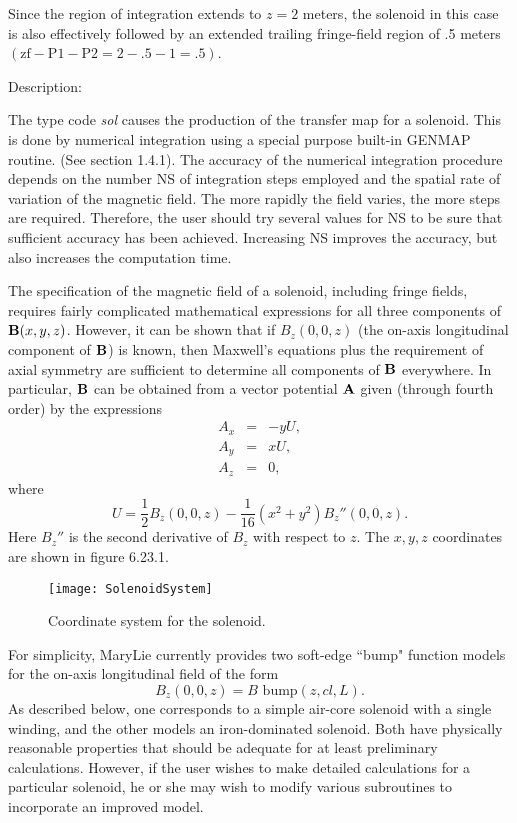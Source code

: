     Since the region of integration extends to $z=2$ meters, the solenoid in this case is also effectively followed by an extended trailing fringe-field region of .5 meters
$(\mbox{zf} - \mbox{P1} - \mbox{P2} = 2 - .5 - 1 = .5 )$.

\vspace{5mm}
     Description:
\vspace{2mm}

     The type code {\em sol } causes the production of the transfer map
for a solenoid.  This is done by numerical integration using a special
purpose built-in GENMAP routine.  (See section 1.4.1).  The accuracy of the numerical integration procedure depends on the number NS of integration steps employed and the spatial rate of variation of the magnetic field.  The more rapidly the field varies, the more steps are required.  Therefore, the user should try several values for NS to be sure that sufficient accuracy has been achieved.  Increasing NS improves the accuracy, but also increases the computation time.

     The specification of the magnetic field of a solenoid, including fringe fields, requires fairly complicated mathematical expressions for all three components of
     ${\bf B}(x,y,z)$.  However, it can be shown that if $B_z(0,0,z)$
(the on-axis longitudinal component of ${\bf B}$) is known, then
Maxwell's equations plus the requirement of axial symmetry are sufficient
to determine all components of ${\bf B}$ everywhere.  In particular,
${\bf B}$ can be obtained from a vector potential ${\bf A}$ given (through fourth order) by the expressions
\begin{eqnarray*}
A_x &=& -yU,\\
A_y &=& xU,\\
A_z &=& 0,
\end{eqnarray*}
where
\[ U=\frac{1}{2}B_z(0,0,z) - \frac{1}{16}(x^2 + y^2)B_z''(0,0,z). \]
Here $B_z''$ is the second derivative of $B_z$ with respect to $z$.  The
$x,y,z$ coordinates are shown in figure 6.23.1.

\begin{figure}[p]
  \centering
  \texttt{[image: SolenoidSystem]}
  \caption{Coordinate system for the solenoid.}
\end{figure}

\clearpage

For simplicity, MaryLie currently provides two soft-edge ``bump" function models for the on-axis longitudinal field of the form
\[ B_z(0,0,z) = B \mbox{ bump}(z,cl,L).  \]
As described below, one corresponds to a simple air-core solenoid with a single winding, and the other models an iron-dominated solenoid.  Both have physically reasonable properties that should be adequate for at least preliminary calculations.  However, if the user wishes to make detailed calculations for a particular solenoid, he or she may wish to modify various \Mary subroutines to incorporate an improved model.

